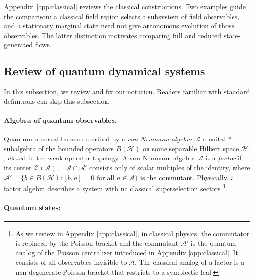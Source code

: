 \documentclass[a4paper,11pt]{article}
\theoremstyle{definition}
\begin{document}
Appendix~\ref{app:classical} reviews the classical constructions. Two examples guide the comparison: a classical field region selects a subsystem of field observables, and a stationary marginal state need not give autonomous evolution of those observables. The latter distinction motivates comparing full and reduced state-generated flows.

\subsection{Review of quantum dynamical systems}

In this subsection, we review and fix our notation. Readers familiar with standard definitions can skip this subsection.

\paragraph{Algebra of quantum observables:}
Quantum observables are described by a 
\emph{von Neumann algebra} $\mathcal{A}$ a unital $*$-subalgebra of the bounded operators
$B(\mathcal{H})$ on some separable Hilbert space $\mathcal{H}$, closed in the
weak operator topology.
A von Neumann algebra $\mathcal{A}$ is a \emph{factor} if its center
$\mathcal{Z}(\mathcal{A}) = \mathcal{A}\cap\mathcal{A}'$ consists only of scalar multiples
of the identity, where $\mathcal{A}' = \{b\in B(\mathcal{H}) : [b,a]=0\text{ for all }a\in\mathcal{A}\}$
is the commutant.  Physically, a factor algebra describes a system with no classical
superselection sectors \footnote{As we review in Appendix \ref{app:classical}, in classical physics, the commutator is replaced by the Poisson bracket and the commutant $\mathcal{A}'$ is the quantum analog of the Poisson
centralizer introduced in Appendix \ref{app:classical}. It consists of all observables invisible to $\mathcal{A}$. The classical analog of a factor is a non-degenerate Poisson bracket that restricts to a symplectic leaf.}.

\paragraph{Quantum states:}
\end{document}
